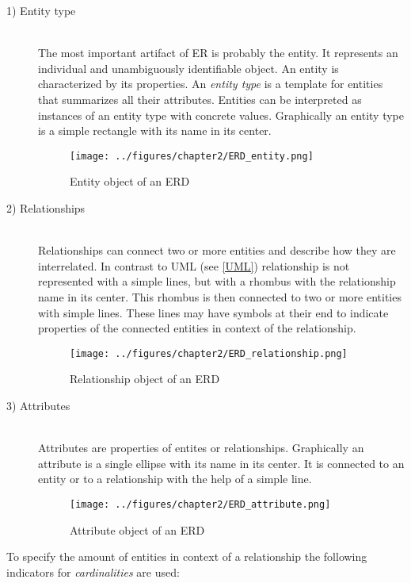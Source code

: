 \documentclass[twoside, openright, 12pt]{book}
\begin{document}
\begin{description}
\item[1) Entity type]\hfill \\
The most important artifact of ER is probably the entity.
It represents an individual and unambiguously identifiable object.
An entity is characterized by its properties.
An \textit{entity type} is a template for entities that summarizes all their attributes.
Entities can be interpreted as instances of an entity type with concrete values.
Graphically an entity type is a simple rectangle with its name in its center.

\begin{figure}[htb]
	\centering
	\texttt{[image: ../figures/chapter2/ERD\_entity.png]}
	\caption{Entity object of an ERD}
	\label{fig:ERD_entity}
\end{figure}

\item[2) Relationships]\hfill \\
Relationships can connect two or more entities and describe how they are interrelated.
In contrast to UML (see \ref{UML}) relationship is not represented with a simple lines, but with a rhombus with the relationship name in its center.
This rhombus is then connected to two or more entities with simple lines.
These lines may have symbols at their end to indicate properties of the connected entities in context of the relationship.

\begin{figure}[htb]
	\centering
	\texttt{[image: ../figures/chapter2/ERD\_relationship.png]}
	\caption{Relationship object of an ERD}
	\label{fig:ERD_relationship}
\end{figure}

\item[3) Attributes]\hfill \\
Attributes are properties of entites or relationships.
Graphically an attribute is a single ellipse with its name in its center.
It is connected to an entity or to a relationship with the help of a simple line.

\begin{figure}[htb]
	\centering
	\texttt{[image: ../figures/chapter2/ERD\_attribute.png]}
	\caption{Attribute object of an ERD}
	\label{fig:ERD_}
\end{figure}
\end{description}

\noindent
To specify the amount of entities in context of a relationship the following indicators for \textit{cardinalities} are used:
\end{document}
